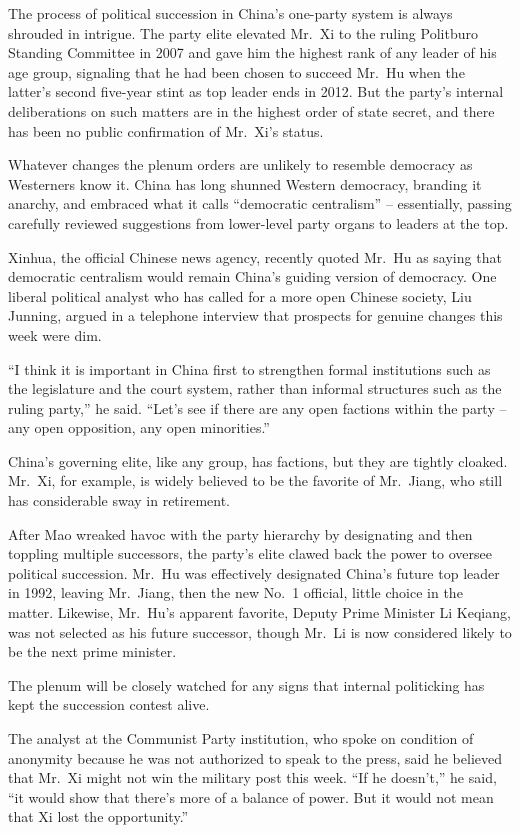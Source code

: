 ﻿\documentclass[12pt]{article}
\begin{document}
The process of political succession in China's one-party system is always shrouded in intrigue. The
party elite elevated Mr.~Xi to the ruling Politburo Standing Committee in 2007 and gave him the
highest rank of any leader of his age group, signaling that he had been chosen to succeed Mr.~Hu
when the latter's second five-year stint as top leader ends in 2012. But the party's internal
deliberations on such matters are in the highest order of state secret, and there has been no public
confirmation of Mr.~Xi's status.

Whatever changes the plenum\cite{plenum} orders are unlikely to resemble democracy as Westerners
know it. China has long shunned Western democracy, branding it anarchy, and embraced what it calls
``democratic centralism'' -- essentially, passing carefully reviewed suggestions from lower-level
party organs to leaders at the top.

Xinhua, the official Chinese news agency, recently quoted Mr.~Hu as saying that democratic
centralism would remain China's guiding version of democracy. One liberal political analyst who has
called for a more open Chinese society, Liu Junning, argued in a telephone interview that prospects
for genuine changes this week were dim.

``I think it is important in China first to strengthen formal institutions such as the legislature
and the court system, rather than informal structures such as the ruling party,'' he said. ``Let's
see if there are any open factions within the party -- any open opposition, any open minorities.''

China's governing elite, like any group, has factions, but they are tightly cloaked. Mr.~Xi, for
example, is widely believed to be the favorite of Mr.~Jiang, who still has considerable sway in
retirement.

After Mao wreaked havoc with the party hierarchy by designating and then toppling multiple
successors, the party's elite clawed back the power to oversee political succession. Mr.~Hu was
effectively designated China's future top leader in 1992, leaving Mr.~Jiang, then the new No.~1
official, little choice in the matter. Likewise, Mr.~Hu's apparent favorite, Deputy Prime Minister
Li Keqiang, was not selected as his future successor, though Mr.~Li is now considered likely to be
the next prime minister.

The plenum will be closely watched for any signs that internal politicking has kept the succession
contest alive.

The analyst at the Communist Party institution, who spoke on condition of anonymity because he was
not authorized to speak to the press, said he believed that Mr.~Xi might not win the military post
this week. ``If he doesn't,'' he said, ``it would show that there's more of a balance of power. But
it would not mean that Xi lost the opportunity.''
\end{document}
